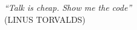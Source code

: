 \begin{epigrafe}
    \vspace*{\fill}
	\begin{flushright}
		\textit{``Talk is cheap. Show me the code''} \\
		(LINUS TORVALDS)
	\end{flushright}
\end{epigrafe}

